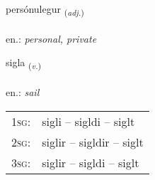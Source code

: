 \documentclass[frontgrid, backgrid]{flacards}\usepackage[]{graphicx}\usepackage[]{xcolor}
\begin{document}
\renewcommand{\flhead}{\vskip5pt \fboxsep=0pt {\small\bfseries\footnotesize Lýsingarorð | Adjective}}
\renewcommand{\fcfoot}{\vskip5pt \fboxsep=0pt \hspace{2pt}{\small\bfseries\footnotesize 2K}}

\renewcommand{\blhead}{\vskip5pt {\small\bfseries\footnotesize Lýsingarorð | Adjective }}
\renewcommand{\bcfoot}{\vskip5pt \hspace{2pt}{\small\bfseries\footnotesize 2K}}


{persónulegur \small{\textsubscript{(\textit{adj.})}} \\[1ex] %
 \\
en.: \emph{personal, private} \\  [2ex]
\renewcommand*{\arraystretch}{0.8}
}

\renewcommand{\flhead}{\vskip5pt \fboxsep=0pt {\small\bfseries\footnotesize Sagnorð | Verb}}
\renewcommand{\fcfoot}{\vskip5pt \fboxsep=0pt \hspace{2pt}{\small\bfseries\footnotesize 2K}}

\renewcommand{\blhead}{\vskip5pt {\small\bfseries\footnotesize Sagnorð | Verb }}
\renewcommand{\bcfoot}{\vskip5pt \hspace{2pt}{\small\bfseries\footnotesize 2K}}


{sigla \small{\textsubscript{(\textit{v.})}} \\[1ex] %
\textphonetic{[sɪkla]} \\
en.: \emph{sail} \\  [2ex]
\renewcommand*{\arraystretch}{0.8}
\begin{tabular}{p{1cm}l}
\textsc{1sg}: & sigli -- sigldi -- siglt \\ 
\textsc{2sg}: & siglir -- sigldir -- siglt \\ 
\textsc{3sg}: & siglir -- sigldi -- siglt \\ 
\end{tabular}
}
\end{document}
